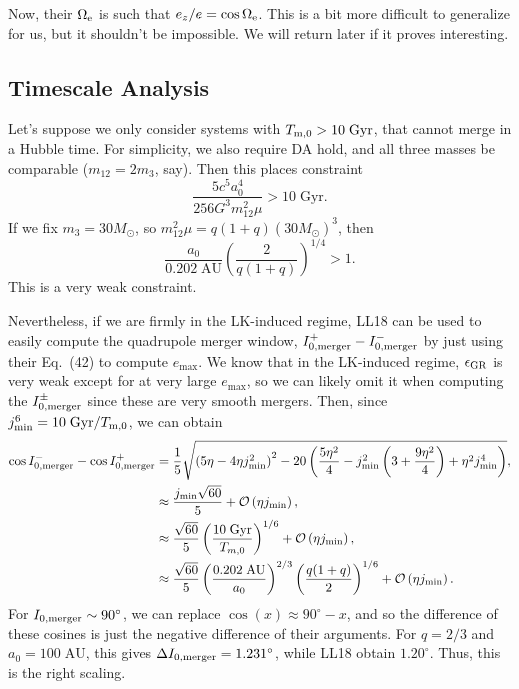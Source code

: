 \documentclass[10pt]{article}%
\newcommand*{\p}[1]{\left(#1\right)}
\begin{document}
Now, their $\Omega_{\rm e}$ is such that $e_z / e = \cos \Omega_{\rm e}$. This
is a bit more difficult to generalize for us, but it shouldn't be impossible. We
will return later if it proves interesting.

\subsection{Timescale Analysis}

Let's suppose we only consider systems with $T_{\rm m, 0} > 10\;\mathrm{Gyr}$,
that cannot merge in a Hubble time. For simplicity, we also require DA hold, and
all three masses be comparable ($m_{12} = 2m_3$, say). Then this places
constraint
\begin{equation}
    \frac{5c^5a_0^4}{256G^3m_{12}^2\mu} > 10\;\mathrm{Gyr}.
\end{equation}
If we fix $m_3 = 30M_{\odot}$, so $m_{12}^2\mu = q(1+q)\p{30M_{\odot}}^3$, then
\begin{equation}
    \frac{a_0}{0.202\;\mathrm{AU}}\p{\frac{2}{q(1+q)}}^{1/4} > 1.
\end{equation}
This is a very weak constraint.

Nevertheless, if we are firmly in the LK-induced regime, LL18 can be used to
easily compute the quadrupole merger window, $I_{\rm 0, merger}^+ - I_{\rm 0,
merger}^-$ by just using their Eq.~(42) to compute $e_{\max}$. We know that in
the LK-induced regime, $\epsilon_{\rm GR}$ is very weak except for at very large
$e_{\max}$, so we can likely omit it when computing the $I_{\rm 0,
merger}^{\pm}$ since these are very smooth mergers. Then, since $j_{\min}^6 =
10\;\mathrm{Gyr} / T_{\rm m, 0}$, we can obtain
\begin{align}
    \cos I_{\rm 0, merger}^- - \cos I_{\rm 0, merger}^+
        &= \frac{1}{5}\sqrt{
            \p{5\eta - 4\eta j_{\min}^2}^2
            - 20\p{\frac{5\eta^2}{4}
                - j_{\min}^2\p{3 + \frac{9\eta^2}{4}}
                + \eta^2j_{\min}^4}},\\
        &\approx \frac{j_{\min}\sqrt{60}}{5}
            + \mathcal{O}\p{\eta j_{\min}},\\
        &\approx \frac{\sqrt{60}}{5}\p{\frac{10\;\mathrm{Gyr}}{T_{m, 0}}}^{1/6}
            + \mathcal{O}\p{\eta j_{\min}},\\
        &\approx \frac{\sqrt{60}}{5}\p{\frac{0.202\;\mathrm{AU}}{a_0}}^{2/3}
            \p{\frac{q(1+q)}{2}}^{1/6}
            + \mathcal{O}\p{\eta j_{\min}}.
\end{align}
For $I_{\rm 0, merger} \sim 90^\circ$, we can replace $\cos(x) \approx 90^\circ
- x$, and so the difference of these cosines is just the negative difference of
their arguments. For $q = 2/3$ and $a_0 = 100\;\mathrm{AU}$, this gives $\Delta
I_{\rm 0, merger} = 1.231^\circ$, while LL18 obtain $1.20^\circ$. Thus, this is
the right scaling.
\end{document}
